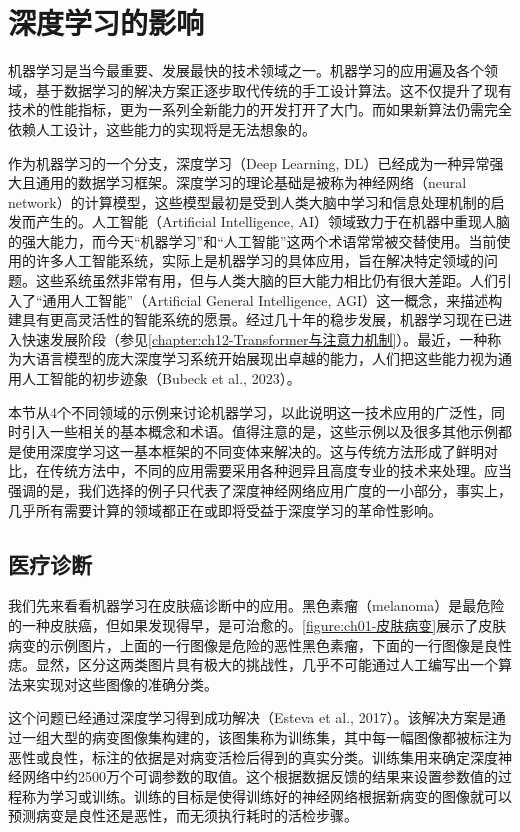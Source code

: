\documentclass[../../main.tex]{subfiles}
\begin{document}
\section{深度学习的影响}\label{section:ch01-深度学习的影响}

机器学习是当今最重要、发展最快的技术领域之一。机器学习的应用遍及各个领域，基于数据学习的解决方案正逐步取代传统的手工设计算法。这不仅提升了现有技术的性能指标，更为一系列全新能力的开发打开了大门。而如果新算法仍需完全依赖人工设计，这些能力的实现将是无法想象的。

作为机器学习的一个分支，深度学习（Deep Learning, DL）已经成为一种异常强大且通用的数据学习框架。深度学习的理论基础是被称为神经网络（neural network）的计算模型，这些模型最初是受到人类大脑中学习和信息处理机制的启发而产生的。人工智能（Artificial Intelligence, AI）领域致力于在机器中重现人脑的强大能力，而今天“机器学习”和“人工智能”这两个术语常常被交替使用。当前使用的许多人工智能系统，实际上是机器学习的具体应用，旨在解决特定领域的问题。这些系统虽然非常有用，但与人类大脑的巨大能力相比仍有很大差距。人们引入了“通用人工智能”（Artificial General Intelligence, AGI）这一概念，来描述构建具有更高灵活性的智能系统的愿景。经过几十年的稳步发展，机器学习现在已进入快速发展阶段（参见\cref{chapter:ch12-Transformer与注意力机制}）。最近，一种称为大语言模型的庞大深度学习系统开始展现出卓越的能力，人们把这些能力视为通用人工智能的初步迹象（Bubeck et al., 2023）。

本节从4个不同领域的示例来讨论机器学习，以此说明这一技术应用的广泛性，同时引入一些相关的基本概念和术语。值得注意的是，这些示例以及很多其他示例都是使用深度学习这一基本框架的不同变体来解决的。这与传统方法形成了鲜明对比，在传统方法中，不同的应用需要采用各种迥异且高度专业的技术来处理。应当强调的是，我们选择的例子只代表了深度神经网络应用广度的一小部分，事实上，几乎所有需要计算的领域都正在或即将受益于深度学习的革命性影响。

\subsection{医疗诊断}\label{subsection:ch01-医疗诊断}

我们先来看看机器学习在皮肤癌诊断中的应用。黑色素瘤（melanoma）是最危险的一种皮肤癌，但如果发现得早，是可治愈的。\cref{figure:ch01-皮肤病变}展示了皮肤病变的示例图片，上面的一行图像是危险的恶性黑色素瘤，下面的一行图像是良性痣。显然，区分这两类图片具有极大的挑战性，几乎不可能通过人工编写出一个算法来实现对这些图像的准确分类。

这个问题已经通过深度学习得到成功解决（Esteva et al., 2017）。该解决方案是通过一组大型的病变图像集构建的，该图集称为训练集，其中每一幅图像都被标注为恶性或良性，标注的依据是对病变活检后得到的真实分类。训练集用来确定深度神经网络中约2500万个可调参数的取值。这个根据数据反馈的结果来设置参数值的过程称为学习或训练。训练的目标是使得训练好的神经网络根据新病变的图像就可以预测病变是良性还是恶性，而无须执行耗时的活检步骤。
\end{document}
